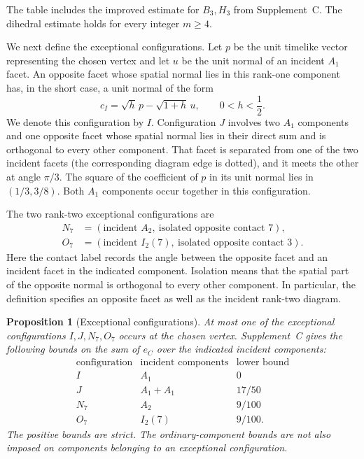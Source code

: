 \documentclass[11pt]{article}
\newtheorem{proposition}[theorem]{Proposition}
\theoremstyle{definition}
\theoremstyle{remark}
\numberwithin{equation}{section}
\begin{document}
The table includes the improved estimate for $B_3,H_3$ from
Supplement~C. The dihedral estimate holds for every integer $m\ge4$.

We next define the exceptional configurations. Let $p$ be the unit
timelike vector representing the chosen vertex and let $u$ be the unit
normal of an incident $A_1$ facet. An opposite facet whose spatial
normal lies in this rank-one component has, in the short case, a unit
normal of the form
\begin{equation}\label{c:I-normal}
 c_I=\sqrt h\,p-\sqrt{1+h}\,u,
 \qquad 0<h<\frac12.
\end{equation}
We denote this configuration by $I$.
Configuration $J$ involves two $A_1$ components and one opposite
facet whose spatial normal lies in their direct sum and is orthogonal
to every other component. That facet is separated from one of the two incident facets
(the corresponding diagram edge is dotted), and it meets the other
at angle $\pi/3$. The square of the coefficient of $p$ in its unit
normal lies in $(1/3,3/8)$. Both $A_1$ components occur together in
this configuration.

The two rank-two exceptional configurations are
\[
 \begin{aligned}
 N_7&=(\text{incident }A_2,\ \text{isolated opposite contact }7),\\
 O_7&=(\text{incident }I_2(7),\ \text{isolated opposite contact }3).
 \end{aligned}
\]
Here the contact label records the angle between the opposite facet
and an incident facet in the indicated component. Isolation means
that the spatial part of the opposite normal is orthogonal to every
other component. In particular, the definition specifies an opposite
facet as well as the incident rank-two diagram.

\begin{proposition}[Exceptional configurations]
\label{c:defect-input}
At most one of the exceptional configurations $I,J,N_7,O_7$ occurs at the
chosen vertex. Supplement~C gives the following bounds on the sum of
$e_C$ over the indicated incident components:
\[
\begin{array}{c|c|c}
\text{configuration}&\text{incident components}&\text{lower bound}\\\hline
I&A_1&0\\
J&A_1+A_1&17/50\\
N_7&A_2&9/100\\
O_7&I_2(7)&9/100.
\end{array}
\]
The positive bounds are strict. The ordinary-component bounds are not
also imposed on components belonging to an exceptional configuration.
\end{proposition}
\end{document}
